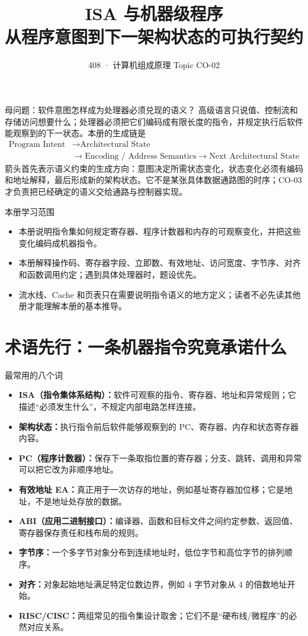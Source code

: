 \documentclass[UTF8,fontset=fandol,11pt,a4paper]{ctexart}
\title{\vspace{-1.1cm}\textbf{ISA 与机器级程序}\\[0.4em]
\large 从程序意图到下一架构状态的可执行契约}
\author{408 · 计算机组成原理 Topic CO-02}
\date{}
\newcommand{\kw}[1]{\textbf{\color{deep}#1}}
\begin{document}
\maketitle

\begin{corebox}{母问题：软件意图怎样成为处理器必须兑现的语义？}
高级语言只说值、控制流和存储访问想要什么；处理器必须把它们编码成有限长度的指令，并规定执行后软件能观察到的下一状态。本册的生成链是
\[
\boxed{\begin{aligned}
\text{Program Intent}&\to\text{Architectural State}\\
&\to\text{Encoding / Address Semantics}\to\text{Next Architectural State}
\end{aligned}}
\]
箭头首先表示语义约束的生成方向：意图决定所需状态变化，状态变化必须有编码和地址解释，最后形成新的架构状态。它不是某张具体数据通路图的时序；CO-03 才负责把已经确定的语义交给通路与控制器实现。
\end{corebox}

\begin{methodbox}{本册学习范围}
\begin{itemize}
  \item 本册说明指令集如何规定寄存器、程序计数器和内存的可观察变化，并把这些变化编码成机器指令。
  \item 本册解释操作码、寄存器字段、立即数、有效地址、访问宽度、字节序、对齐和函数调用约定；遇到具体处理器时，题设优先。
  \item 流水线、Cache 和页表只在需要说明指令语义的地方定义；读者不必先读其他册才能理解本册的基本推导。
\end{itemize}
\end{methodbox}

\section{术语先行：一条机器指令究竟承诺什么}
\begin{methodbox}{最常用的八个词}
\begin{itemize}
  \item \kw{ISA（指令集体系结构）：}软件可观察的指令、寄存器、地址和异常规则；它描述“必须发生什么”，不规定内部电路怎样连接。
  \item \kw{架构状态：}执行指令前后软件能够观察到的 PC、寄存器、内存和状态寄存器内容。
  \item \kw{PC（程序计数器）：}保存下一条取指位置的寄存器；分支、跳转、调用和异常可以把它改为非顺序地址。
  \item \kw{有效地址 EA：}真正用于一次访存的地址，例如基址寄存器加位移；它是地址，不是地址处存放的数据。
  \item \kw{ABI（应用二进制接口）：}编译器、函数和目标文件之间约定参数、返回值、寄存器保存责任和栈布局的规则。
  \item \kw{字节序：}一个多字节对象分布到连续地址时，低位字节和高位字节的排列顺序。
  \item \kw{对齐：}对象起始地址满足特定位数边界，例如 4 字节对象从 4 的倍数地址开始。
  \item \kw{RISC/CISC：}两组常见的指令集设计取舍；它们不是“硬布线/微程序”的必然对应关系。
\end{itemize}
\end{methodbox}
\end{document}
